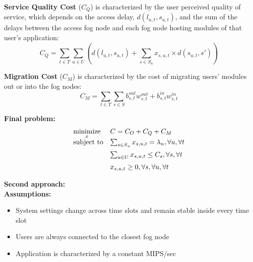 \documentclass{article}
\begin{document}
\vspace{12pt}
\noindent\textbf{Service Quality Cost} ($C_Q$) is characterized by the user perceived quality of service, which depends on the access delay, $d(l_{u,t}, s_{u,t})$, and the sum of the delays between the access fog node and each fog node hosting modules of that user's application:
\begin{equation}
    C_Q = \sum_{t \in T} \sum_{u \in U} \left(d(l_{u,t}, s_{u,t}) + \sum_{s \in S_u} x_{s,u,t} \times d(s_{u,t}, s')\right)
\end{equation}

\vspace{12pt}
\noindent\textbf{Migration Cost} ($C_M$) is characterized by the cost of migrating users' modules out or into the fog nodes:
\begin{equation}
    C_M = \sum_{t \in T} \sum_{s \in S} b^{out}_{s,t}w^{out}_{s,t} + b^{in}_{s,t}w^{in}_{s,t}
\end{equation}

\vspace{12pt}
\noindent\textbf{Final problem:}\\[6pt]
\begin{equation} 
    \begin{array}[t]{ll} 
        \underset{x}{\text{minimize}} & C = C_O + C_Q + C_M \\
        
        \text{subject to} & \sum_{s \in S_u} x_{s,u,t} = \lambda_u, \forall u, \forall t \\[6pt]
        & \sum_{u \in U} x_{s,u,t} \leq C_s, \forall s, \forall t \\[6pt]
        & x_{s,u,t} \geq 0, \forall s, \forall u, \forall t
    \end{array}
\end{equation}
\pagebreak

\noindent\textbf{Second approach:}\\[6pt]
\vspace{12pt}
\noindent\textbf{Assumptions:}\\[6pt]
\begin{itemize}
    \item System settings change across time slots and remain stable inside every time slot
    \item Users are always connected to the closest fog node
    \item Application is characterized by a constant MIPS/sec
\end{itemize}
\end{document}
